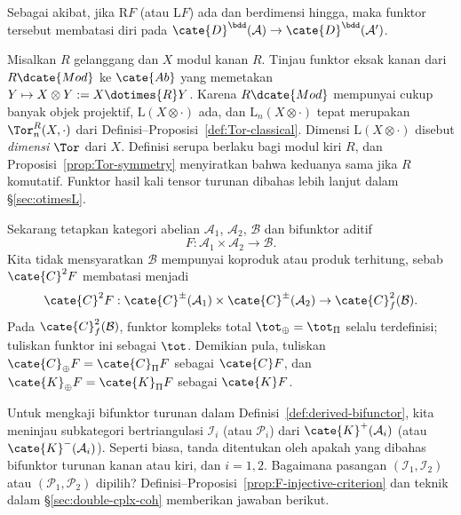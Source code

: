 	Sebagai akibat, jika $\mathrm{R}F$ (atau $\mathrm{L}F$) ada dan berdimensi
	hingga, maka funktor tersebut membatasi diri pada
$\cate{D}^{\bdd}(\mathcal{A})\to\cate{D}^{\bdd}(\mathcal{A}')$.

\begin{contoh}\label{eg:Tor-dimension}
	Misalkan $R$ gelanggang dan $X$ modul kanan $R$. Tinjau funktor eksak kanan
	dari $R\dcate{Mod}$ ke $\cate{Ab}$ yang memetakan
	$Y\mapsto X\otimes Y:=X\dotimes{R}Y$. Karena $R\dcate{Mod}$ mempunyai cukup
	banyak objek projektif, $\mathrm{L}(X\otimes\cdot)$ ada, dan
	$\mathrm{L}_n(X\otimes\cdot)$ tepat merupakan
	$\Tor^R_n(X,\cdot)$ dari Definisi--Proposisi~\ref{def:Tor-classical}.
	Dimensi $\mathrm{L}(X\otimes\cdot)$ disebut \emph{dimensi $\Tor$} dari
	$X$. Definisi serupa berlaku bagi modul kiri $R$, dan
	Proposisi~\ref{prop:Tor-symmetry} menyiratkan bahwa keduanya sama jika $R$
	komutatif. Funktor hasil kali tensor turunan dibahas lebih lanjut dalam
	\S\ref{sec:otimesL}.
\end{contoh}

Sekarang tetapkan kategori abelian $\mathcal{A}_1$, $\mathcal{A}_2$,
$\mathcal{B}$ dan bifunktor aditif
\[ F: \mathcal{A}_1 \times \mathcal{A}_2 \to \mathcal{B}. \]
Kita tidak mensyaratkan $\mathcal{B}$ mempunyai koproduk atau produk terhitung,
sebab $\cate{C}^2F$ membatasi menjadi
\begin{gather*}
	\cate{C}^2 F: \cate{C}^{\pm}(\mathcal{A}_1) \times \cate{C}^{\pm} (\mathcal{A}_2) \to \cate{C}^2_f(\mathcal{B}).
\end{gather*}
Pada $\cate{C}^2_f(\mathcal{B})$, funktor kompleks total
$\tot_{\oplus}=\tot_{\Pi}$ selalu terdefinisi; tuliskan funktor ini sebagai
$\tot$. Demikian pula, tuliskan
$\cate{C}_{\oplus}F=\cate{C}_{\Pi}F$ sebagai $\cate{C}F$, dan
$\cate{K}_{\oplus}F=\cate{K}_{\Pi}F$ sebagai $\cate{K}F$.

Untuk mengkaji bifunktor turunan dalam Definisi~\ref{def:derived-bifunctor},
kita meninjau subkategori bertriangulasi $\mathcal{I}_i$ (atau
$\mathcal{P}_i$) dari $\cate{K}^+(\mathcal{A}_i)$ (atau
$\cate{K}^-(\mathcal{A}_i)$). Seperti biasa, tanda ditentukan oleh apakah
yang dibahas bifunktor turunan kanan atau kiri, dan $i=1,2$. Bagaimana pasangan
$(\mathcal{I}_1,\mathcal{I}_2)$ atau $(\mathcal{P}_1,\mathcal{P}_2)$ dipilih?
Definisi--Proposisi~\ref{prop:F-injective-criterion} dan teknik dalam
\S\ref{sec:double-cplx-coh} memberikan jawaban berikut.


